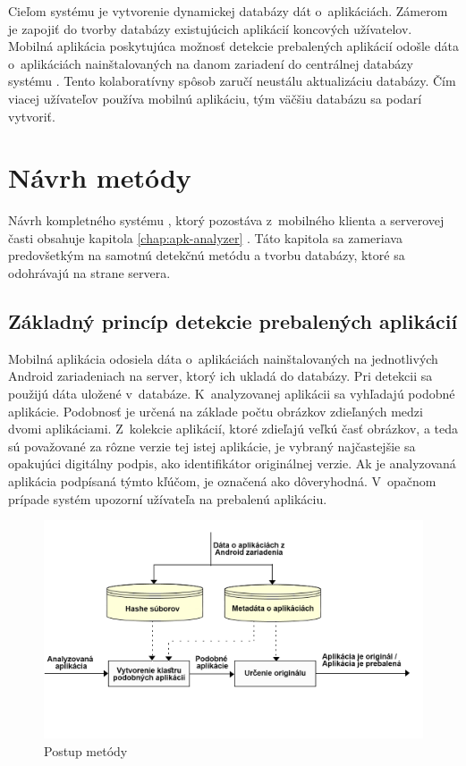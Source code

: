 Cieľom systému  je vytvorenie dynamickej databázy dát o~aplikáciách. Zámerom je zapojiť do tvorby databázy existujúcich aplikácií koncových užívatelov. Mobilná aplikácia poskytujúca možnosť detekcie prebalených aplikácií odošle dáta o~aplikáciách nainštalovaných na danom zariadení do centrálnej databázy systému . Tento kolaboratívny spôsob zaručí neustálu aktualizáciu databázy. Čím viacej užívateľov používa mobilnú aplikáciu, tým väčšiu databázu sa podarí vytvoriť.

\section{Návrh metódy}
Návrh kompletného systému , ktorý pozostáva z~mobilného klienta a serverovej časti obsahuje kapitola \ref{chap:apk-analyzer} . Táto kapitola sa zameriava predovšetkým na samotnú detekčnú metódu a tvorbu databázy, ktoré sa odohrávajú na strane servera.

\subsection{Základný princíp detekcie prebalených aplikácií}
Mobilná aplikácia  odosiela dáta o~aplikáciách nainštalovaných na jednotlivých Android zariadeniach na server, ktorý ich ukladá do databázy. Pri detekcii sa použijú dáta uložené v~databáze. K~analyzovanej aplikácii sa vyhľadajú podobné aplikácie. Podobnosť je určená na základe počtu obrázkov zdieľaných medzi dvomi aplikáciami. Z~kolekcie aplikácií, ktoré zdieľajú veľkú časť obrázkov, a teda sú považované za rôzne verzie tej istej aplikácie, je vybraný najčastejšie sa opakujúci digitálny podpis, ako identifikátor originálnej verzie. Ak je analyzovaná aplikácia podpísaná týmto kľúčom, je označená ako dôveryhodná. V~opačnom prípade systém upozorní užívateľa na prebalenú aplikáciu. 

\begin{figure}[htb]
  \begin{center}
    \includegraphics[width=130mm]{images/detection-overview.png}
  \end{center}
  \caption{Postup metódy }
  \label{fig:metódaApkAnalyzer}
\end{figure}

